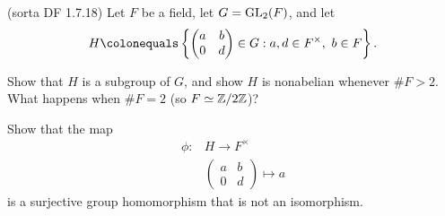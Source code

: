 \begin{problem} \textsf{(sorta DF 1.7.18)}
  Let $F$ be a field, let $G=\mathrm{GL}_2(F)$, and let 
  \begin{equation*}
    H \colonequals \left\{
    \begin{pmatrix}
      a & b \\
      0 & d
    \end{pmatrix}
    \in G : a,d \in F^\times,\ b \in F\right\}. 
  \end{equation*}
  \begin{enumalph}
  \item Show that $H$ is a subgroup of $G$,
  and show $H$ is nonabelian whenever $\#F > 2$.
  What happens when $\#F=2$ (so $F \simeq \mathbb{Z}/2\mathbb{Z}$)?
  \item Show that the map 
  \begin{align*}
    \phi \colon &H \to F^\times \\
                &\begin{pmatrix} a & b \\ 0 & d \end{pmatrix} \mapsto a 
  \end{align*}
  is a surjective group homomorphism that is not an isomorphism.
  \end{enumalph}
\end{problem}
